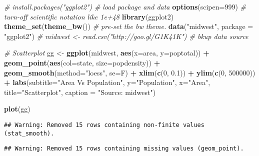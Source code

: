 \documentclass[a4paper]{article}
\newenvironment{Shaded}{\begin{snugshade}}{\end{snugshade}}
\newcommand{\KeywordTok}[1]{\textcolor[rgb]{0.13,0.29,0.53}{\textbf{#1}}}
\newcommand{\DataTypeTok}[1]{\textcolor[rgb]{0.13,0.29,0.53}{#1}}
\newcommand{\DecValTok}[1]{\textcolor[rgb]{0.00,0.00,0.81}{#1}}
\newcommand{\FloatTok}[1]{\textcolor[rgb]{0.00,0.00,0.81}{#1}}
\newcommand{\StringTok}[1]{\textcolor[rgb]{0.31,0.60,0.02}{#1}}
\newcommand{\CommentTok}[1]{\textcolor[rgb]{0.56,0.35,0.01}{\textit{#1}}}
\newcommand{\OperatorTok}[1]{\textcolor[rgb]{0.81,0.36,0.00}{\textbf{#1}}}
\newcommand{\NormalTok}[1]{#1}
\begin{document}
\begin{Shaded}
\begin{Highlighting}[]
\CommentTok{# install.packages("ggplot2")}
\CommentTok{# load package and data}
\KeywordTok{options}\NormalTok{(}\DataTypeTok{scipen=}\DecValTok{999}\NormalTok{)  }\CommentTok{# turn-off scientific notation like 1e+48}
\KeywordTok{library}\NormalTok{(ggplot2)}
\KeywordTok{theme_set}\NormalTok{(}\KeywordTok{theme_bw}\NormalTok{())  }\CommentTok{# pre-set the bw theme.}
\KeywordTok{data}\NormalTok{(}\StringTok{"midwest"}\NormalTok{, }\DataTypeTok{package =} \StringTok{"ggplot2"}\NormalTok{)}
\CommentTok{# midwest <- read.csv("http://goo.gl/G1K41K")  # bkup data source}

\CommentTok{# Scatterplot}
\NormalTok{gg <-}\StringTok{ }\KeywordTok{ggplot}\NormalTok{(midwest, }\KeywordTok{aes}\NormalTok{(}\DataTypeTok{x=}\NormalTok{area, }\DataTypeTok{y=}\NormalTok{poptotal)) }\OperatorTok{+}\StringTok{ }
\StringTok{  }\KeywordTok{geom_point}\NormalTok{(}\KeywordTok{aes}\NormalTok{(}\DataTypeTok{col=}\NormalTok{state, }\DataTypeTok{size=}\NormalTok{popdensity)) }\OperatorTok{+}\StringTok{ }
\StringTok{  }\KeywordTok{geom_smooth}\NormalTok{(}\DataTypeTok{method=}\StringTok{"loess"}\NormalTok{, }\DataTypeTok{se=}\NormalTok{F) }\OperatorTok{+}\StringTok{ }
\StringTok{  }\KeywordTok{xlim}\NormalTok{(}\KeywordTok{c}\NormalTok{(}\DecValTok{0}\NormalTok{, }\FloatTok{0.1}\NormalTok{)) }\OperatorTok{+}\StringTok{ }
\StringTok{  }\KeywordTok{ylim}\NormalTok{(}\KeywordTok{c}\NormalTok{(}\DecValTok{0}\NormalTok{, }\DecValTok{500000}\NormalTok{)) }\OperatorTok{+}\StringTok{ }
\StringTok{  }\KeywordTok{labs}\NormalTok{(}\DataTypeTok{subtitle=}\StringTok{"Area Vs Population"}\NormalTok{, }
       \DataTypeTok{y=}\StringTok{"Population"}\NormalTok{, }
       \DataTypeTok{x=}\StringTok{"Area"}\NormalTok{, }
       \DataTypeTok{title=}\StringTok{"Scatterplot"}\NormalTok{, }
       \DataTypeTok{caption =} \StringTok{"Source: midwest"}\NormalTok{)}

\KeywordTok{plot}\NormalTok{(gg)}
\end{Highlighting}
\end{Shaded}

\begin{verbatim}
## Warning: Removed 15 rows containing non-finite values (stat_smooth).
\end{verbatim}

\begin{verbatim}
## Warning: Removed 15 rows containing missing values (geom_point).
\end{verbatim}
\end{document}
